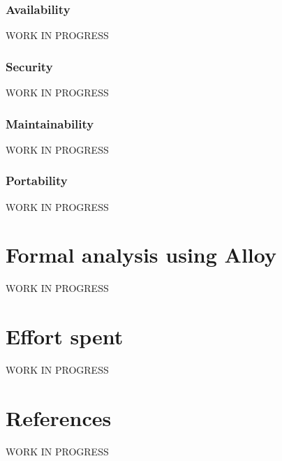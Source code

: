 \documentclass{report}
\begin{document}
			\subsection{Availability}
			WORK IN PROGRESS
			\subsection{Security}
			WORK IN PROGRESS
			\subsection{Maintainability}
			WORK IN PROGRESS
			\subsection{Portability}
			WORK IN PROGRESS
	\chapter{Formal analysis using Alloy}
	WORK IN PROGRESS
	\chapter{Effort spent}
	WORK IN PROGRESS
	\chapter{References}
	WORK IN PROGRESS
	
\end{document}
